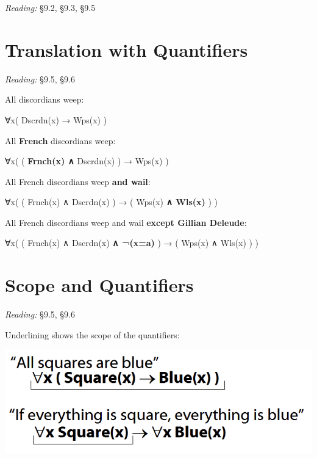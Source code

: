 \documentclass[12pt]{extarticle}
\begin{document}
\begin{multicols*}{3}
\emph{Reading:} §9.2, §9.3, §9.5
 
 
\vfill
\columnbreak

 
\section{Translation with Quantifiers}
 
\emph{Reading:} §9.5, §9.6
 
\begin{minipage}{\columnwidth}
 
All discordians weep:
 
∀x( Dscrdn(x) → Wps(x) )
 
\end{minipage}
 
\begin{minipage}{\columnwidth}
 
All \textbf{French} discordians weep:
 
∀x( ( \textbf{Frnch(x) ∧} Dscrdn(x) ) → Wps(x) )
 
\end{minipage}
 
\begin{minipage}{\columnwidth}
 
All French discordians weep \textbf{and wail}:
 
∀x( ( Frnch(x) ∧ Dscrdn(x) ) → ( Wps(x) \textbf{ ∧ Wls(x)} ) )
 
\end{minipage}
 
\begin{minipage}{\columnwidth}
 
All French discordians weep and wail \textbf{except Gillian Deleude}:
 
∀x( ( Frnch(x) ∧ Dscrdn(x) \textbf{∧ ¬(x=a)} ) → ( Wps(x) ∧ Wls(x) ) )
 
\end{minipage}
 
 
 
\section{Scope and Quantifiers}
 
\emph{Reading:} §9.5, §9.6
 
\begin{minipage}{\columnwidth}
 
Underlining shows the scope of the quantifiers:
 
\begin{center}
\includegraphics[scale=0.3]{img/scope_quantifiers.png}
\end{center}
\end{minipage}
 

\end{multicols*}
\end{document}
